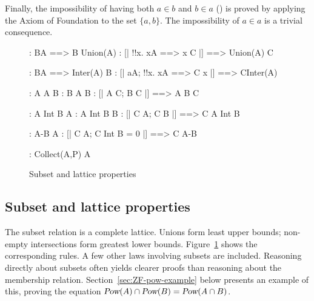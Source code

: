 Finally, the impossibility of having both $a\in b$ and $b\in a$
() is proved by applying the Axiom of Foundation to
the set $\{a,b\}$.  The impossibility of $a\in a$ is a trivial consequence.



\begin{figure}
\begin{alltt*}\isastyleminor
{}:    B\isasymin{}A ==> B \isasymsubseteq Union(A)
:    [| !!x. x\isasymin{}A ==> x \isasymsubseteq C |] ==> Union(A) \isasymsubseteq C

:    B\isasymin{}A ==> Inter(A) \isasymsubseteq B
: [| a\isasymin{}A; !!x. x\isasymin{}A ==> C \isasymsubseteq x |] ==> C\isasymsubseteq{}Inter(A)

:      A \isasymsubseteq A \isasymunion B
:      B \isasymsubseteq A \isasymunion B
:       [| A \isasymsubseteq C;  B \isasymsubseteq C |] ==> A \isasymunion B \isasymsubseteq C

:     A Int B \isasymsubseteq A
:     A Int B \isasymsubseteq B
:   [| C \isasymsubseteq A;  C \isasymsubseteq B |] ==> C \isasymsubseteq A Int B

:    A-B \isasymsubseteq A
:  [| C \isasymsubseteq A;  C Int B = 0 |] ==> C \isasymsubseteq A-B

: Collect(A,P) \isasymsubseteq A
\end{alltt*}
\caption{Subset and lattice properties} \label{zf-subset}
\end{figure}


\subsection{Subset and lattice properties}
The subset relation is a complete lattice.  Unions form least upper bounds;
non-empty intersections form greatest lower bounds.  Figure~\ref{zf-subset}
shows the corresponding rules.  A few other laws involving subsets are
included. 
Reasoning directly about subsets often yields clearer proofs than
reasoning about the membership relation.  Section~\ref{sec:ZF-pow-example}
below presents an example of this, proving the equation 
${\emph{\sl Pow}(A)\cap \emph{\sl Pow}(B)}= \emph{\sl Pow}(A\cap B)$.


